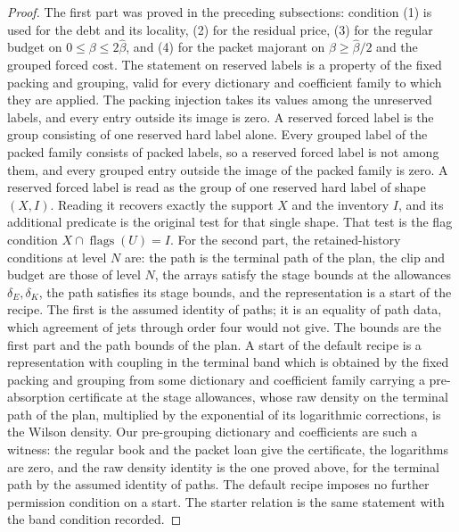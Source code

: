 \begin{proof}
The first part was proved in the preceding subsections: condition (1)
is used for the debt and its locality, (2) for the residual price,
(3) for the regular budget on $0\le\beta\le2\widehat\beta$, and (4)
for the packet majorant on $\beta\ge\widehat\beta/2$ and the grouped
forced cost. The statement on reserved labels is a property of the
fixed packing and grouping, valid for every dictionary and
coefficient family to which they are applied. The packing injection
takes its values among the unreserved labels, and every entry outside
its image is zero. A reserved forced label is the group consisting of
one reserved hard label alone. Every grouped label of the packed
family consists of packed labels, so a reserved forced label is not
among them, and every grouped entry outside the image of the packed
family is zero. A reserved forced label is read as the group of one
reserved hard label of shape $(X,I)$. Reading it recovers exactly the
support $X$ and the inventory $I$, and its additional predicate is the
original test for that single shape. That test is the flag condition
$X\cap\operatorname{flags}(U)=I$. For the second part, the retained-history conditions at
level $N$ are: the path is the terminal path of the plan, the clip
and budget are those of level $N$, the arrays satisfy the stage
bounds at the allowances $\delta_E,\delta_K$, the path satisfies its
stage bounds, and the representation is a start of the recipe. The
first is the assumed identity of paths; it is an equality of path
data, which agreement of jets through order four would not give. The
bounds are the first part and the path bounds of the plan. A start of
the default recipe is a representation with coupling in the terminal
band which is obtained by the fixed packing and grouping from some
dictionary and coefficient family carrying a pre-absorption
certificate at the stage allowances, whose raw density on the
terminal path of the plan, multiplied by the exponential of its
logarithmic corrections, is the Wilson density. Our pre-grouping
dictionary and coefficients are such a witness: the regular book and
the packet loan give the certificate, the logarithms are zero, and
the raw density identity is the one proved above, for the terminal
path by the assumed identity of paths. The default recipe imposes no
further permission condition on a start. The starter relation is the
same statement with the band condition recorded.
\end{proof}

